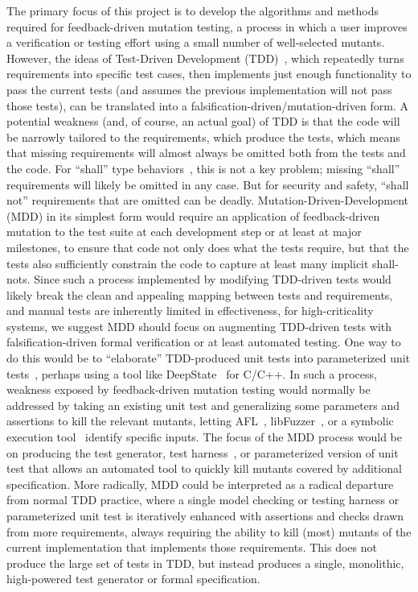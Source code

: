 The primary focus of this project is to develop the algorithms and methods required for feedback-driven mutation testing, a process in which a user improves a verification or testing effort using a small number of well-selected mutants.  However, the ideas of Test-Driven Development (TDD)~\cite{TDD,TDDFuture}, which repeatedly turns requirements into specific test cases, then implements just enough functionality to pass the current tests (and assumes the previous implementation will not pass those tests), can be translated into a falsification-driven/mutation-driven form.  A potential weakness (and, of course, an actual goal) of TDD is that the code will be narrowly tailored to the requirements, which produce the tests, which means that missing requirements will almost always be omitted both from the tests and the code.  For ``shall'' type behaviors~\cite{INCOSE}, this is not a key problem; missing ``shall'' requirements will likely be omitted in any case.  But for security and safety, ``shall not'' requirements that are omitted can be deadly.  Mutation-Driven-Development (MDD) in its simplest form would require an application of feedback-driven mutation to the test suite at each development step or at least at major milestones, to ensure that code not only does what the tests require, but that the tests also sufficiently constrain the code to capture at least many implicit shall-nots.  Since such a process implemented by modifying TDD-driven tests would likely break the clean and appealing mapping between tests and requirements, and manual tests are inherently limited in effectiveness, for high-criticality systems, we suggest MDD should focus on augmenting TDD-driven tests with falsification-driven formal verification or at least automated testing.  One way to do this would be to ``elaborate'' TDD-produced unit tests into parameterized unit tests~\cite{UnitMeister,ParamUnit}, perhaps using a tool like DeepState~\cite{DeepState} for C/C++.  In such a process, weakness exposed by feedback-driven mutation testing would normally be addressed by taking an existing unit test and generalizing some parameters and assertions to kill the relevant mutants, letting AFL~\cite{aflfuzz}, libFuzzer~\cite{libfuzzer}, or a symbolic execution tool~\cite{angr1,angr2,manticore} identify specific inputs.  The focus of the MDD process would be on producing the test generator, test harness~\cite{WODACommon,tstlsttt}, or parameterized version of unit test that allows an automated tool to quickly kill mutants covered by additional specification.  More radically, MDD could be interpreted as a radical departure from normal TDD practice, where a single model checking or testing harness or parameterized unit test is iteratively enhanced with assertions and checks drawn from more requirements, always requiring the ability to kill (most) mutants of the current implementation that implements those requirements.  This does not produce the large set of tests in TDD, but instead produces a single, monolithic, high-powered test generator or formal specification.

